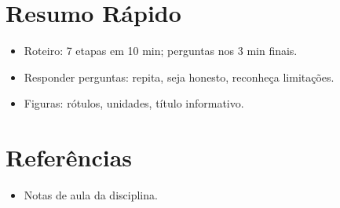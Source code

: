 \documentclass[12pt,a4paper]{article}
\begin{document}
\section*{Resumo R\'apido}
\begin{itemize}
  \item Roteiro: 7 etapas em 10 min; perguntas nos 3 min finais.
  \item Responder perguntas: repita, seja honesto, reconhe\c{c}a limita\c{c}\~oes.
  \item Figuras: r\'otulos, unidades, t\'itulo informativo.
\end{itemize}

\section*{Refer\^encias}
\begin{itemize}
  \item Notas de aula da disciplina.
\end{itemize}
\end{document}
